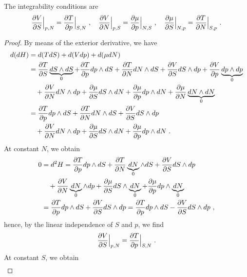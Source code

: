     The integrability conditions are 
    \begin{equation}\label{td:int:h}
        \frac{\partial V}{\partial S} \Big \vert_{p,N} = \frac{\partial T}{\partial p} \Big \vert_{S,N} ~, \quad 
        \frac{\partial V}{\partial N} \Big \vert_{p,S} = \frac{\partial\mu}{\partial p} \Big \vert_{N, S} ~, \quad 
        \frac{\partial\mu}{\partial S} \Big \vert_{N,p} = \frac{\partial T}{\partial N} \Big \vert_{S, p} ~. 
    \end{equation}
    \begin{proof}
        By means of the exterior derivative, we have 
        \begin{equation*}
        \begin{aligned}
            d (dH) & = d (T dS) + d (V dp) + d (\mu dN) \\ & = \frac{\partial T}{\partial S} \underbrace{dS \wedge dS}_0 + \frac{\partial T}{\partial p} dp \wedge dS + \frac{\partial T}{\partial N} dN \wedge dS + \frac{\partial V}{\partial S} dS \wedge dp + \frac{\partial V}{\partial p} \underbrace{dp \wedge dp}_0 \\ & \quad + \frac{\partial V}{\partial N} dN \wedge dp + \frac{\partial\mu}{\partial S} dS \wedge dN + \frac{\partial\mu}{\partial p} dp \wedge dN + \frac{\partial\mu}{\partial N} \underbrace{dN \wedge dN}_0 \\ & = \frac{\partial T}{\partial p} dp \wedge dS + \frac{\partial T}{\partial N} dN \wedge dS + \frac{\partial V}{\partial S} dS \wedge dp \\ & \quad + \frac{\partial V}{\partial N} dN \wedge dp + \frac{\partial\mu}{\partial S} dS \wedge dN + \frac{\partial\mu}{\partial p} dp \wedge dN  ~.
        \end{aligned}
        \end{equation*}
        At constant $N$, we obtain
        \begin{equation*}
        \begin{aligned}
            0 & = d^2 H = \frac{\partial T}{\partial p} dp \wedge dS + \frac{\partial T}{\partial N} \underbrace{dN}_0 \wedge dS + \frac{\partial V}{\partial S} dS \wedge dp \\ & \quad + \frac{\partial V}{\partial N} \underbrace{dN}_0 \wedge dp + \frac{\partial\mu}{\partial S} dS \wedge \underbrace{dN}_0 + \frac{\partial\mu}{\partial p} dp \wedge \underbrace{dN}_0 \\ & = \frac{\partial T}{\partial p} dp \wedge dS + \frac{\partial V}{\partial S} dS \wedge dp = \frac{\partial T}{\partial p} dp \wedge dS - \frac{\partial V}{\partial S} dS \wedge dp ~,
        \end{aligned}
        \end{equation*}
        hence, by the linear independence of $S$ and $p$, we find
        \begin{equation*}
            \frac{\partial V}{\partial S} \Big \vert_{p,N} = \frac{\partial T}{\partial p} \Big \vert_{S,N} ~.
        \end{equation*}
        At constant $S$, we obtain
        \begin{equation*}
        \begin{aligned}

\end{aligned}
\end{equation*}
\end{proof}

